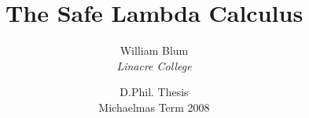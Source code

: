 \documentclass[a4paper,11pt]{article}
\title{The Safe Lambda Calculus}
\author{William Blum \\ \emph{Linacre College}}
\date{D.Phil. Thesis \\ Michaelmas Term 2008}
\begin{document}
\maketitle
\thispagestyle{empty}
\begin{abstract}

\end{abstract}
\end{document}
